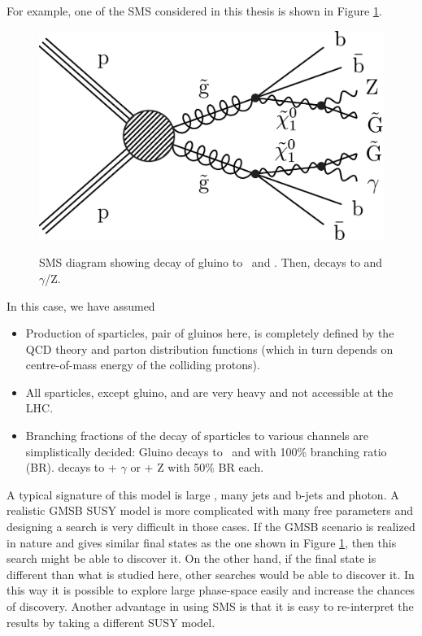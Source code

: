 For example, one of the SMS considered in this thesis is shown in Figure \ref{fig:T5bbbbZG_sms}. 
\begin{figure}[htb]
\centering
\includegraphics[width=0.4\linewidth]{../Figures/Chap1/Figure_001-b.pdf}\\
\caption[SMS diagrams]{SMS diagram showing decay of gluino to \bbbar\ and \nuone. Then, \nuone decays to \grav and $\gamma$/Z.}
\label{fig:T5bbbbZG_sms}
\end{figure}
In this case, we have assumed
\begin{itemize}
\item Production of sparticles, pair of gluinos here, is completely defined by the QCD theory and parton distribution functions (which in 
turn depends on centre-of-mass energy of the colliding protons).
\item All sparticles, except gluino, \nuone and \grav are very heavy and not accessible at the LHC.
\item Branching fractions of the decay of sparticles to various channels are simplistically decided:
\subitem Gluino decays to \bbbar\ and \nuone with 100\% branching ratio (BR).
\subitem \nuone decays to \grav + $\gamma$ or \grav + Z with 50\% BR each.
\end{itemize}
A typical signature of this model is large \ptmiss, many jets and b-jets and photon. A realistic GMSB SUSY model is more complicated
with many free parameters and designing a search is very difficult in those cases. If the GMSB scenario is realized in nature
and gives similar final states as the one shown in Figure \ref{fig:T5bbbbZG_sms}, then this search might be able to discover it.
On the other hand, if the final state is different than what is studied here, other searches would be able to discover it. In this way
it is possible to explore large phase-space easily and increase the chances of discovery.  Another advantage in using SMS 
is that it is easy to re-interpret the results by taking a different SUSY model.